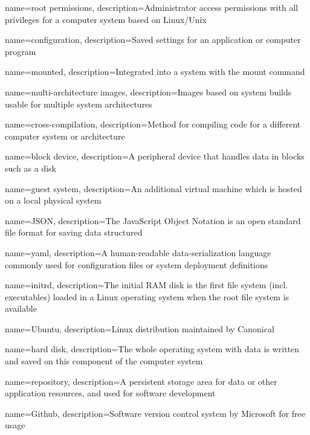 {
    name={root permissions},
    description={Administrator access permissions with all privileges for a computer system based on Linux/Unix}
}

{
    name={configuration},
    description={Saved settings for an application or computer program}
}

{
    name={mounted},
    description={Integrated into a system with the mount command}
}

{
    name={multi-architecture images},
    description={Images based on system builds usable for multiple system architectures}
}

{
    name={cross-compilation},
    description={Method for compiling code for a different computer system or architecture}
}

{
    name={block device},
    description={A peripheral device that handles data in blocks such as a disk}
}

{
    name={guest system},
    description={An additional virtual machine which is hosted on a local physical system}
}

{
    name={JSON},
    description={The JavaScript Object Notation is an open standard file format for saving data structured}
}

{
    name={yaml},
    description={A human-readable data-serialization language commonly used for configuration files or system deployment definitions}
}

{
    name={initrd},
    description={The initial RAM disk is the first file system (incl. executables) loaded in a Linux operating system when the root file system is available}
}

{
    name={Ubuntu},
    description={Linux distribution maintained by Canonical}
}

{
    name={hard disk},
    description={The whole operating system with data is written and saved on this component of the computer system}
}

{
    name={repository},
    description={A persistent storage area for data or other application resources, and used for software development}
}

{
    name={Github},
    description={Software version control system by Microsoft for free usage}
}

\glsaddall
